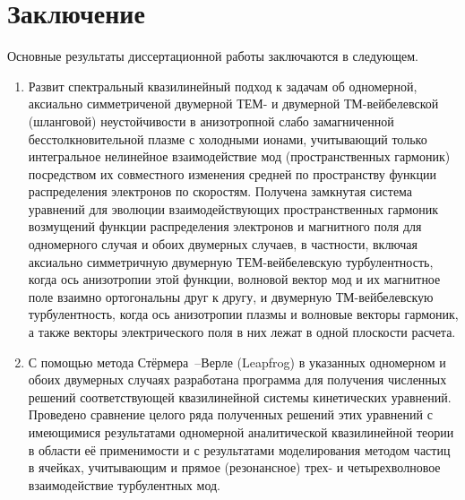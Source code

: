 \chapter*{Заключение}                       %

Основные результаты диссертационной работы заключаются в следующем.

\begin{enumerate}
    \item Развит спектральный квазилинейный подход к задачам об одномерной, аксиально симметриченой двумерной ТЕМ- и двумерной ТМ-вейбелевской (шланговой) неустойчивости в анизотропной слабо замагниченной бесстолкновительной плазме с холодными ионами, учитывающий только интегральное нелинейное взаимодействие мод (пространственных гармоник) посредством их совместного изменения средней по пространству функции распределения электронов по скоростям.
    Получена замкнутая система уравнений для эволюции взаимодействующих пространственных гармоник возмущений функции распределения электронов и магнитного поля для одномерного случая и обоих двумерных случаев, в частности, включая аксиально симметричную двумерную ТЕМ-вейбелевскую турбулентность, когда ось анизотропии этой функции, волновой вектор мод и их магнитное поле взаимно ортогональны друг к другу, и двумерную ТМ-вейбелевскую турбулентность, когда ось анизотропии плазмы и волновые векторы гармоник, а также векторы электрического поля в них лежат в одной плоскости расчета.
    
    \item С помощью метода Стёрмера~--Верле (Leapfrog) в указанных одномерном и обоих двумерных случаях разработана программа для получения численных решений соответствующей квазилинейной системы кинетических уравнений. Проведено сравнение целого ряда полученных решений этих уравнений с имеющимися результатами одномерной аналитической квазилинейной теории в области её применимости и с результатами моделирования методом частиц в ячейках, учитывающим и прямое (резонансное) трех- и четырехволновое взаимодействие турбулентных мод. 


\end{enumerate}
